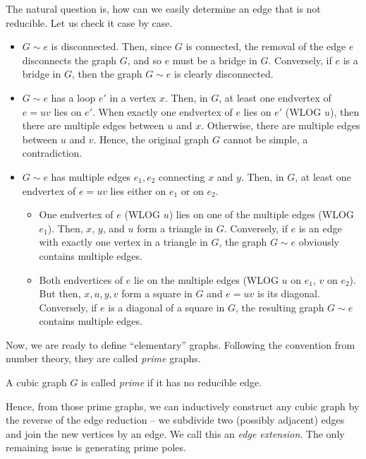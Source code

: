 The natural question is, how can we easily determine an edge that is not reducible. Let us check it case by case.
\begin{itemize}
    \item $G\sim e$ is disconnected. Then, since $G$ is connected, the removal of the edge $e$ disconnects the graph $G$, and so $e$ must be a bridge in $G$. Conversely, if $e$ is a bridge in $G$, then the graph $G\sim e$ is clearly disconnected.
    \item $G\sim e$ has a loop $e'$ in a vertex $x$. Then, in $G$, at least one endvertex of $e=uv$ lies on $e'$. When exactly one endvertex of $e$ lies on $e'$ (WLOG $u$), then there are multiple edges between $u$ and $x$. Otherwise, there are multiple edges between $u$ and $v$. Hence, the original graph $G$ cannot be simple, a contradiction.
    \item $G\sim e$ has multiple edges $e_1, e_2$ connecting $x$ and $y$. Then, in $G$, at least one endvertex of $e=uv$ lies either on $e_1$ or on $e_2$.
    \begin{itemize}
        \item One endvertex of $e$ (WLOG $u$) lies on one of the multiple edges (WLOG $e_1$). Then, $x$, $y$, and $u$ form a triangle in $G$. Conversely, if $e$ is an edge with exactly one vertex in a triangle in $G$, the graph $G\sim e$ obviously contains multiple edges.
        \item Both endvertices of $e$ lie on the multiple edges (WLOG $u$ on $e_1$, $v$ on $e_2$). But then, $x, u, y, v$ form a square in $G$ and $e=uv$ is its diagonal. Conversely, if $e$ is a diagonal of a square in $G$, the resulting graph $G\sim e$ contains multiple edges.
    \end{itemize}
\end{itemize}

Now, we are ready to define ``elementary'' graphs. Following the convention from number theory, they are called \emph{prime} graphs.

\begin{definition}\cite[p. 70]{snarkhunter}
    A cubic graph $G$ is called \emph{prime} if it has no reducible edge.
\end{definition}

Hence, from those prime graphs, we can inductively construct any cubic graph by the reverse of the edge reduction -- we subdivide two (possibly adjacent) edges and join the new vertices by an edge. We call this an \emph{edge extension}. The only remaining issue is generating prime poles.

